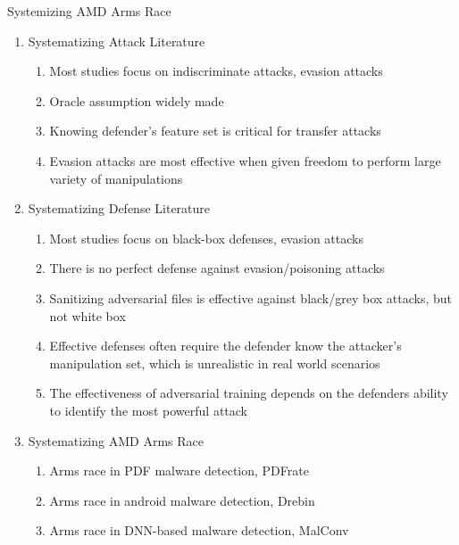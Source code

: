 \documentclass{article}
\begin{document}
\noindent Systemizing AMD Arms Race
\begin{enumerate}
\item Systematizing Attack Literature
	\begin{enumerate}
	\item Most studies focus on indiscriminate attacks, evasion attacks
	\item Oracle assumption widely made
	\item Knowing defender's feature set is critical for transfer attacks
	\item Evasion attacks are most effective when given freedom to perform large variety of manipulations
	\end{enumerate}
\item Systematizing Defense Literature
	\begin{enumerate}
	\item Most studies focus on black-box defenses, evasion attacks
	\item There is no perfect defense against evasion/poisoning attacks
	\item Sanitizing adversarial files is effective against black/grey box attacks, but not white box
	\item Effective defenses often require the defender know the attacker's manipulation set, which is unrealistic in real world scenarios
	\item The effectiveness of adversarial training depends on the defenders ability to identify the most powerful attack
	\end{enumerate}
\item Systematizing AMD Arms Race
	\begin{enumerate}
	\item Arms race in PDF malware detection, PDFrate
	\item Arms race in android malware detection, Drebin
	\item Arms race in DNN-based malware detection, MalConv
	\end{enumerate}
\end{enumerate}
\end{document}
